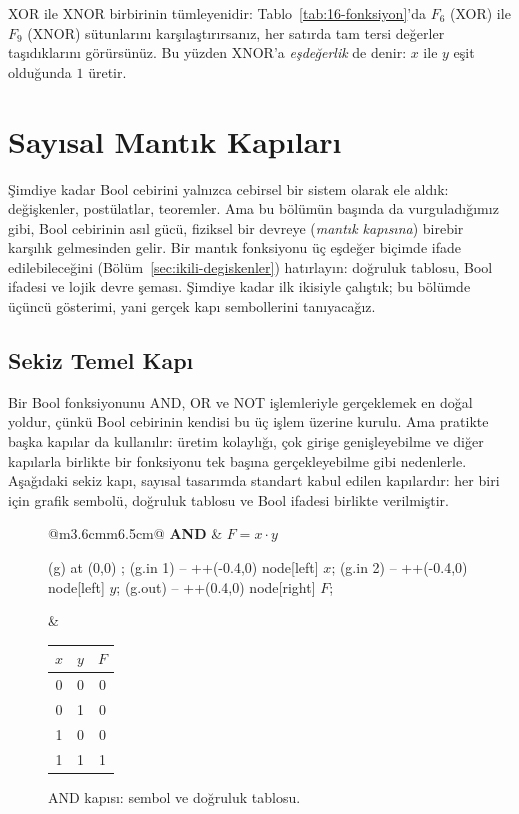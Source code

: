 XOR ile XNOR birbirinin tümleyenidir: Tablo~\ref{tab:16-fonksiyon}'da $F_6$ (XOR) ile
$F_9$ (XNOR) sütunlarını karşılaştırırsanız, her satırda tam tersi değerler taşıdıklarını
görürsünüz. Bu yüzden XNOR'a \emph{eşdeğerlik} de denir: $x$ ile $y$ eşit olduğunda $1$
üretir.

\section{Sayısal Mantık Kapıları}
\label{sec:mantik-kapilari}

Şimdiye kadar Bool cebirini yalnızca cebirsel bir sistem olarak ele aldık: değişkenler,
postülatlar, teoremler. Ama bu bölümün başında da vurguladığımız gibi, Bool cebirinin asıl
gücü, fiziksel bir devreye (\emph{mantık kapısına}) birebir karşılık gelmesinden
gelir. Bir mantık fonksiyonu üç eşdeğer biçimde ifade edilebileceğini
(Bölüm~\ref{sec:ikili-degiskenler}) hatırlayın: doğruluk tablosu, Bool ifadesi ve lojik
devre şeması. Şimdiye kadar ilk ikisiyle çalıştık; bu bölümde üçüncü gösterimi, yani
gerçek kapı sembollerini tanıyacağız.

\subsection{Sekiz Temel Kapı}
\label{sec:sekiz-temel-kapi}

Bir Bool fonksiyonunu AND, OR ve NOT işlemleriyle gerçeklemek en doğal yoldur, çünkü Bool
cebirinin kendisi bu üç işlem üzerine kurulu. Ama pratikte başka kapılar da kullanılır:
üretim kolaylığı, çok girişe genişleyebilme ve diğer kapılarla birlikte bir fonksiyonu tek
başına gerçekleyebilme gibi nedenlerle. Aşağıdaki sekiz kapı, sayısal tasarımda standart
kabul edilen kapılardır: her biri için grafik sembolü, doğruluk tablosu ve Bool ifadesi
birlikte verilmiştir.

\begin{figure}[H]
\centering
\begin{tabular}{@{}m{3.6cm}m{6.5cm}@{}}
\textbf{AND} &
$F=x\cdot y$ \\
\begin{circuitikz}[scale=0.8]
 (g) at (0,0) {};
\draw (g.in 1) -- ++(-0.4,0) node[left] {$x$};
\draw (g.in 2) -- ++(-0.4,0) node[left] {$y$};
\draw (g.out) -- ++(0.4,0) node[right] {$F$};
\end{circuitikz}
&
\begin{tabular}{cc|c}
\toprule
$x$&$y$&$F$\\
\midrule
0&0&0\\0&1&0\\1&0&0\\1&1&1\\
\bottomrule
\end{tabular}
\end{tabular}
\caption{AND kapısı: sembol ve doğruluk tablosu.}
\label{fig:kapi-and}
\end{figure}

